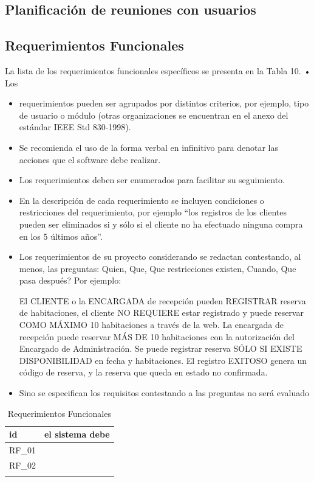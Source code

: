 \subsection{Planificación de reuniones con usuarios}
\subsection{Requerimientos Funcionales}

La lista de los requerimientos funcionales específicos se presenta en la Tabla 10.
• Los \begin{itemize}
    \item requerimientos pueden ser agrupados por distintos criterios, por ejemplo, tipo de usuario o módulo (otras organizaciones se encuentran en el anexo del estándar IEEE Std 830-1998).
    \item Se recomienda el uso de la forma verbal en infinitivo para denotar las acciones que el software debe realizar.
    \item Los requerimientos deben ser enumerados para facilitar su seguimiento. 
    \item En la descripción de cada requerimiento se incluyen condiciones o restricciones del requerimiento, por ejemplo “los registros de los clientes pueden ser eliminados si y sólo si el cliente no ha efectuado ninguna compra en los 5 últimos años”. 
    \item Los requerimientos de su proyecto considerando se redactan contestando, al menos, las preguntas: Quien, Que, Que restricciones existen, Cuando, Que pasa después? Por ejemplo: 
    
    El CLIENTE o la ENCARGADA de recepción pueden REGISTRAR reserva de habitaciones, el cliente NO REQUIERE estar registrado y puede reservar COMO MÁXIMO 10 habitaciones a través de la web. La encargada de recepción puede reservar MÁS DE 10 habitaciones con la autorización del Encargado de Administración. Se puede registrar reserva SÓLO SI EXISTE DISPONIBILIDAD en fecha y habitaciones. El registro EXITOSO genera un código de reserva, y la reserva que queda en estado no confirmada.
    \item Sino se especifican los requisitos contestando a las preguntas no será evaluado
\end{itemize} 

 \begin{table}[H]
    \begin{center}
        \begin{tabular}{ | m{2cm} | m{9cm} | }
            \hline \textbf{id} & \textbf{el sistema debe }\\ \hline
            RF\_01 &   \\ \hline
            RF\_02 &     \\ \hline
              &    \\ \hline
        \end{tabular}
        \caption{Requerimientos Funcionales}
    \end{center}
\end{table}


